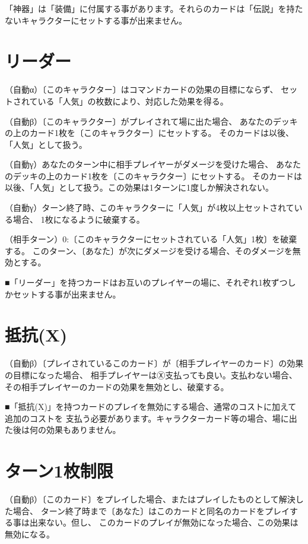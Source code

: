 \documentclass[fontsize=9pt,twocolumn,hanging_punctuation]{jlreq}
\begin{document}
「神器」は「装備」に付属する事があります。それらのカードは「伝説」を持たないキャラクターにセットする事が出来ません。

\section*{リーダー}
（自動α）〔このキャラクター〕はコマンドカードの効果の目標にならず、
セットされている「人気」の枚数により、対応した効果を得る。

（自動β）〔このキャラクター〕がプレイされて場に出た場合、
あなたのデッキの上のカード1枚を〔このキャラクター〕にセットする。
そのカードは以後、「人気」として扱う。

（自動γ）あなたのターン中に相手プレイヤーがダメージを受けた場合、
あなたのデッキの上のカード1枚を〔このキャラクター〕にセットする。
そのカードは以後、「人気」として扱う。この効果は1ターンに1度しか解決されない。

（自動γ）ターン終了時、このキャラクターに「人気」が4枚以上セットされている場合、
1枚になるように破棄する。

（相手ターン）0:〔このキャラクターにセットされている「人気」1枚〕を破棄する。
このターン、〔あなた〕が次にダメージを受ける場合、そのダメージを無効とする。


■「リーダー」を持つカードはお互いのプレイヤーの場に、それぞれ1枚ずつしかセットする事が出来ません。

\section*{抵抗(X)}
（自動β）〔プレイされているこのカード〕が〔相手プレイヤーのカード〕の効果の目標になった場合、
相手プレイヤーはⓍ支払っても良い。支払わない場合、その相手プレイヤーのカードの効果を無効とし、破棄する。

■「抵抗(X)」を持つカードのプレイを無効にする場合、通常のコストに加えて追加のコストを
支払う必要があります。キャラクターカード等の場合、場に出た後は何の効果もありません。

\section*{ターン1枚制限}
（自動β）〔このカード〕をプレイした場合、またはプレイしたものとして解決した場合、
ターン終了時まで〔あなた〕はこのカードと同名のカードをプレイする事は出来ない。但し、
このカードのプレイが無効になった場合、この効果は無効になる。
\end{document}
